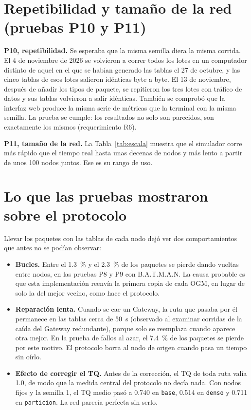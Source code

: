 

\section{Repetibilidad y tamaño de la red (pruebas P10 y P11)}
\label{sec:res-repetibilidad}

\textbf{P10, repetibilidad.} Se esperaba que la misma semilla diera la misma
corrida. El 4 de noviembre de 2026 se volvieron a correr todos los lotes en un
computador distinto de aquel en el que se habían generado las tablas el 27 de
octubre, y las cinco tablas de esos lotes salieron idénticas byte a byte. El 13
de noviembre, después de añadir los tipos de paquete, se repitieron los tres
lotes con tráfico de datos y sus tablas volvieron a salir idénticas. También
se comprobó que la interfaz web produce la misma serie de métricas que la
terminal con la misma semilla. La prueba se cumple: los resultados no solo son
parecidos, son exactamente los mismos (requerimiento R6).

\textbf{P11, tamaño de la red.} La Tabla~\ref{tab:escala} muestra que el
simulador corre más rápido que el tiempo real hasta unas decenas de nodos y más
lento a partir de unos 100 nodos juntos. Ese es su rango de uso.

\section{Lo que las pruebas mostraron sobre el protocolo}
\label{sec:res-protocolo}

Llevar los paquetes con las tablas de cada nodo dejó ver dos comportamientos
que antes no se podían observar:

\begin{itemize}
\item \textbf{Bucles.} Entre el 1.3~\% y el 2.3~\% de los paquetes se pierde
dando vueltas entre nodos, en las pruebas P8 y P9 con B.A.T.M.A.N. La causa
probable es que esta implementación reenvía la primera copia de cada OGM, en
lugar de solo la del mejor vecino, como hace el protocolo.
\item \textbf{Reparación lenta.} Cuando se cae un Gateway, la ruta que pasaba
por él permanece en las tablas cerca de 50~s (observado al examinar corridas de
la caída del Gateway redundante), porque solo se reemplaza cuando aparece otra
mejor. En la prueba de fallos al azar, el 7.4~\% de los paquetes se pierde por
este motivo. El protocolo borra al nodo de origen cuando pasa un tiempo sin
oírlo.
\item \textbf{Efecto de corregir el TQ.} Antes de la corrección, el TQ de toda
ruta valía 1.0, de modo que la medida central del protocolo no decía nada. Con
nodos fijos y la semilla 1, el TQ medio pasó a 0.740 en \texttt{base}, 0.514 en
\texttt{denso} y 0.711 en \texttt{particion}. La red parecía perfecta sin serlo.
\end{itemize}

